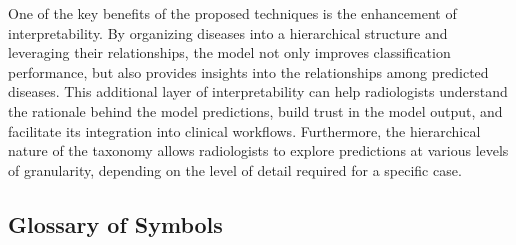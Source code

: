 One of the key benefits of the proposed techniques is the enhancement of interpretability. By organizing diseases into a hierarchical structure and leveraging their relationships, the model not only improves classification performance, but also provides insights into the relationships among predicted diseases. This additional layer of interpretability can help radiologists understand the rationale behind the model predictions, build trust in the model output, and facilitate its integration into clinical workflows. Furthermore, the hierarchical nature of the taxonomy allows radiologists to explore predictions at various levels of granularity, depending on the level of detail required for a specific case.

\subsection{Glossary of Symbols}\label{subsec:notations}

